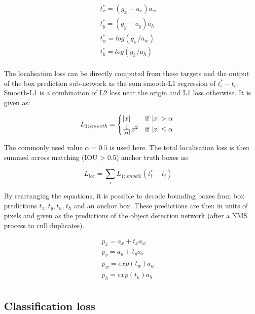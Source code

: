 \begin{equation}
\begin{split}
t^*_x = (g_x - a_x) a_w\\
t^*_y = (g_y - a_y) a_h\\
t^*_w = log(g_w / a_w)\\
t^*_h = log(g_h / a_h)\\
\end{split}
\label{eq:encoding_rcnn}
\end{equation}

The localisation loss can be directly computed from these targets and the output of the box prediction sub-network as the sum smooth-L1 regression of $t_i^* - t_i$. Smooth-L1 is a combination of L2 loss near the origin and L1 loss otherwise. It is given as:

\begin{equation}
L_{1;smooth} = 
\begin{cases*}
|x| & if $|x|>\alpha $ \\
\frac{1}{|\alpha|}x^2 & if $|x| \leq \alpha$
\end{cases*}
\label{eq:smooth_l1}
\end{equation}

The commonly used value $\alpha = 0.5$ is used here. The total localisation loss is then summed across matching (\gls{IOU} > 0.5) anchor truth boxes as:

\begin{equation}
L_{loc} = \sum_i{L_{1;smooth}(t_i^* - t_i)}
\label{eq:loss_loc}
\end{equation}

By rearranging the equations,  it is possible to decode bounding boxes from box predictions $t_x, t_y, t_w, t_h$  and an anchor box. These predictions are then in units of pixels and given as the predictions of the object detection network (after a \gls{NMS} process to cull duplicates).

\begin{equation}
\begin{split}
p_x = a_x + t_x  a_w\\
p_y = a_y + t_y  a_h\\
p_w = exp(t_w) a_w \\
p_h = exp(t_h) a_h\\
\end{split}
\label{eq:decoding_rcnn}
\end{equation}

\subsection {Classification loss}
\label{sec:loss}

